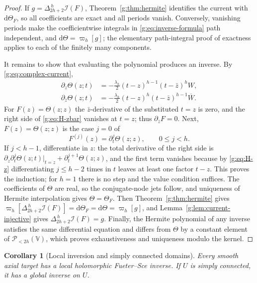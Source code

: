 \documentclass[11pt,a4paper]{article}
\numberwithin{equation}{section}
\newtheorem{corollary}[theorem]{Corollary}
\theoremstyle{definition}
\theoremstyle{remark}
\theoremstyle{plain}
\newcommand{\I}{\mathcal I}
\newcommand{\dd}{\mathrm d}
\newcommand{\lapH}{\Delta_{2h+2}^{\,h}}
\newcommand{\VV}{\mathbb V}                       %
\newcommand{\PolH}{\mathscr P_{<2h}(\VV)}
\newcommand{\cur}{\varpi}                         %
\newcommand{\Herm}{\Theta}                        %
\begin{document}
\begin{proof}
If $g=\lapH\I(F)$, Theorem~\ref{g:thm:hermite} identifies the current with
$\dd\Herm_F$, so all coefficients are exact and all periods vanish.
Conversely, vanishing periods make the coefficientwise integrals in
\eqref{g:eq:inverse-formula} path independent, and $\dd\Herm=\cur_h[g]$; the
elementary path-integral proof of exactness applies to each of the finitely
many components.

It remains to show that evaluating the polynomial produces an inverse. By
\eqref{g:eq:complex-current},
\begin{align}
 \partial_z\Herm(z;t)&=-\frac{\lambda_h}{2}(t-z)^{h-1}(t-\bar z)^hW,
 \label{g:eq:H-z}\\
 \partial_{\bar z}\Herm(z;t)&=-\frac{\lambda_h}{2}(t-z)^h(t-\bar z)^{h-1}
 \overline W. \label{g:eq:H-zbar}
\end{align}
For $F(z)=\Herm(z;z)$ the $\bar z$-derivative of the substituted $t=z$ is zero,
and the right side of \eqref{g:eq:H-zbar} vanishes at $t=z$; thus
$\partial_{\bar z}F=0$. Next, $F(z)=\Herm(z;z)$ is the case $j=0$ of
\begin{equation}\label{g:eq:reconstructed-jets}
 F^{(j)}(z)=\partial_t^j\Herm(z;z),\qquad 0\le j<h .
\end{equation}
If $j<h-1$, differentiate in $z$: the total derivative of the right side is
$\partial_z\partial_t^j\Herm(z;t)|_{t=z}+\partial_t^{j+1}\Herm(z;z)$, and the
first term vanishes because by \eqref{g:eq:H-z} differentiating $j\le h-2$
times in $t$ leaves at least one factor $t-z$. This proves the induction; for
$h=1$ there is no step and the value condition suffices. The coefficients of
$\Herm$ are real, so the conjugate-node jets follow, and uniqueness of Hermite
interpolation gives $\Herm=\Herm_F$. Then Theorem~\ref{g:thm:hermite} gives
$\cur_h[\lapH\I(F)]=\dd\Herm_F=\dd\Herm=\cur_h[g]$, and
Lemma~\ref{g:lem:current-injective} gives $\lapH\I(F)=g$. Finally, the Hermite
polynomial of any inverse satisfies the same differential equation and differs
from $\Herm$ by a constant element of $\PolH$, which proves exhaustiveness and
uniqueness modulo the kernel.
\end{proof}

\begin{corollary}[Local inversion and simply connected domains]
\label{g:cor:local}
Every smooth axial target has a local holomorphic Fueter--Sce inverse. If $U$
is simply connected, it has a global inverse on $U$.
\end{corollary}
\end{document}

